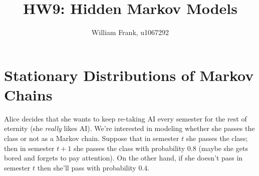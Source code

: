 \documentclass[fleqn]{hermans-hw}
\title{HW9: Hidden Markov Models}
\institute{University of Utah}
\author{William Frank, u1067292}
\begin{document}
\maketitle
\section{Stationary Distributions of Markov Chains}

Alice decides that she wants to keep re-taking AI every semester for
the rest of eternity (she \emph{really} likes AI).  We're interested
in modeling whether she passes the class or not as a Markov chain.
Suppose that in semester $t$ she passes the class; then in semester
$t+1$ she passes the class with probability $0.8$ (maybe she gets
bored and forgets to pay attention).  On the other hand, if she
doesn't pass in semester $t$ then she'll pass with probability $0.4$.
\end{document}
